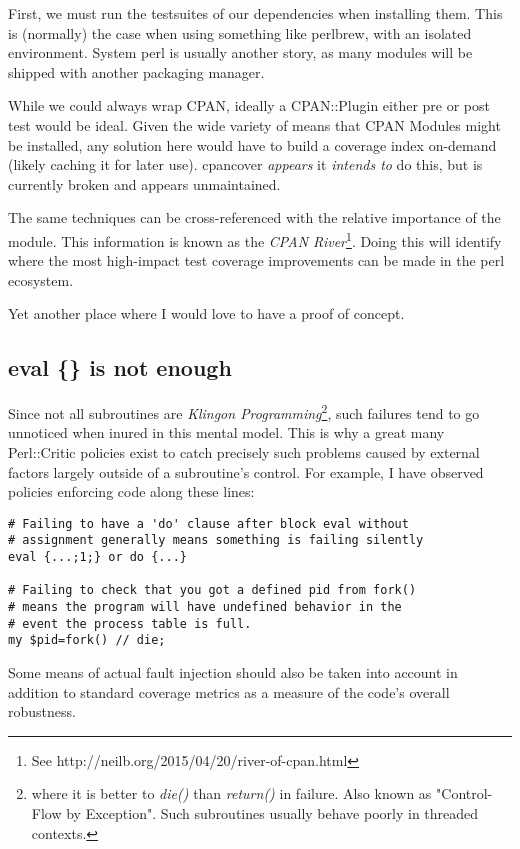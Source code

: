 \documentclass{article}
\begin{document}
First, we must run the testsuites of our dependencies when installing them.
This is (normally) the case when using something like perlbrew, with an isolated environment.
System perl is usually another story, as many modules will be shipped with another packaging manager.

While we could always wrap CPAN, ideally a CPAN::Plugin either pre or post test would be ideal.
Given the wide variety of means that CPAN Modules might be installed, any solution here would have to build a coverage index on-demand (likely caching it for later use).
cpancover \textit{appears} it \textit{intends to} do this, but is currently broken and appears unmaintained.

The same techniques can be cross-referenced with the relative importance of the module.
This information is known as the \textit{CPAN River}\footnote{See http://neilb.org/2015/04/20/river-of-cpan.html}.
Doing this will identify where the most high-impact test coverage improvements can be made in the perl ecosystem.

Yet another place where I would love to have a proof of concept.

\subsection{eval \{\} is not enough}

Since not all subroutines are \textit{Klingon Programming}\footnote{where it is better to \textit{die()} than \textit{return()} in failure.  Also known as "Control-Flow by Exception".  Such subroutines usually behave poorly in threaded contexts.},
such failures tend to go unnoticed when inured in this mental model.
This is why a great many Perl::Critic policies exist to catch precisely such problems caused by external factors largely outside of a subroutine's control.
For example, I have observed policies enforcing code along these lines:
\begin{lstlisting}
# Failing to have a 'do' clause after block eval without
# assignment generally means something is failing silently
eval {...;1;} or do {...}

# Failing to check that you got a defined pid from fork()
# means the program will have undefined behavior in the
# event the process table is full.
my $pid=fork() // die;
\end{lstlisting}
Some means of actual fault injection should also be taken into account in addition to standard coverage metrics as a measure of the code's overall robustness.
\end{document}
